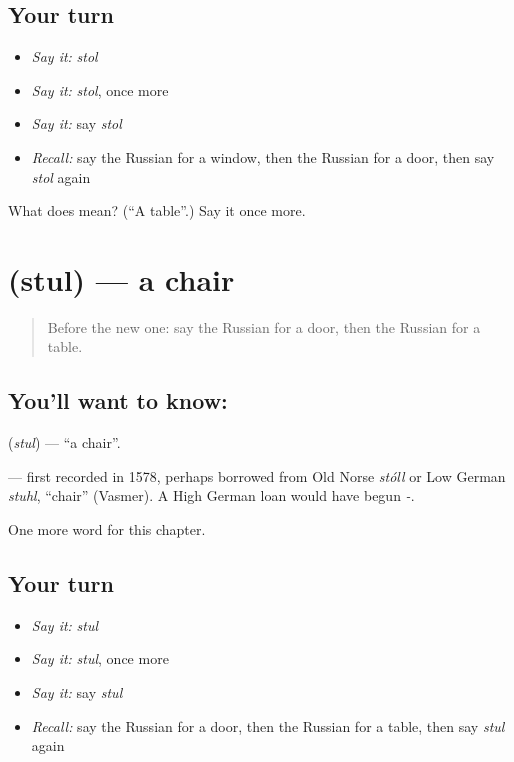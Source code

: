 \subsection*{Your turn}
\begin{itemize}
\raggedright
  \item \emph{Say it:} \emph{stol}
  \item \emph{Say it:} \emph{stol}, once more
  \item \emph{Say it:} say \emph{stol}
  \item \emph{Recall:} say the Russian for a window, then the Russian for a door, then say \emph{stol} again
\end{itemize}

\begin{tcolorbox}[breakable,colback=teal!4,colframe=teal!35!black,title={Before you move on}]
What does  mean? (\textquotedblleft{}A table\textquotedblright{}.) Say it once more.
\end{tcolorbox}
\section[\texorpdfstring{\ru{стул} (stul)}{стул (stul)}]{ (stul) — a chair}

\label{lesson:RU-C49-chair}



\begin{quote}
Before the new one: say the Russian for a door, then the Russian for a table.
\end{quote}

\subsection*{You'll want to know: }
\textbf{} (\emph{stul}) — \textquotedblleft{}a chair\textquotedblright{}.

\begin{cousinweb}
\textbf{} — first recorded in 1578, perhaps borrowed from Old Norse \emph{stóll} or Low German \emph{stuhl}, \textquotedblleft{}chair\textquotedblright{} (Vasmer). A High German loan would have begun \emph{-}.
\end{cousinweb}

\begin{grammarlens}[title={What you've built}]
One more word for this chapter.
\end{grammarlens}

\subsection*{Your turn}
\begin{itemize}
\raggedright
  \item \emph{Say it:} \emph{stul}
  \item \emph{Say it:} \emph{stul}, once more
  \item \emph{Say it:} say \emph{stul}
  \item \emph{Recall:} say the Russian for a door, then the Russian for a table, then say \emph{stul} again
\end{itemize}


